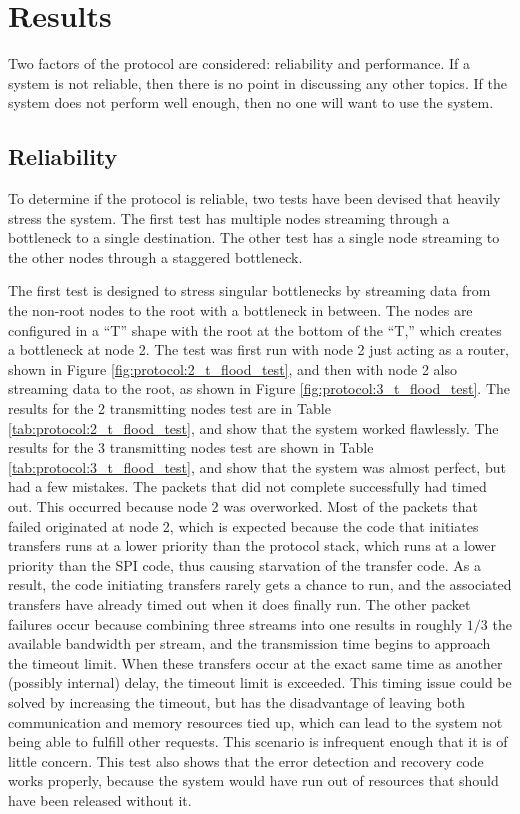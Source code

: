 \section{Results}\label{sec:protocol:results}

Two factors of the protocol are considered: reliability and performance. If a system is not reliable, then there is no point in discussing any other topics. If the system does not perform well enough, then no one will want to use the system.

\subsection{Reliability}\label{sec:protocol:results:reliability}

To determine if the protocol is reliable, two tests have been devised that heavily stress the system. The first test has multiple nodes streaming through a bottleneck to a single destination. The other test has a single node streaming to the other nodes through a staggered bottleneck. 

The first test is designed to stress singular bottlenecks by streaming data from the non-root nodes to the root with a bottleneck in between. The nodes are configured in a ``T'' shape with the root at the bottom of the ``T,'' which creates a bottleneck at node 2. The test was first run with node 2 just acting as a router, shown in Figure \ref{fig:protocol:2_t_flood_test}, and then with node 2 also streaming data to the root, as shown in Figure \ref{fig:protocol:3_t_flood_test}. The results for the 2 transmitting nodes test are in Table \ref{tab:protocol:2_t_flood_test}, and show that the system worked flawlessly. The results for the 3 transmitting nodes test are shown in Table \ref{tab:protocol:3_t_flood_test}, and show that the system was almost perfect, but had a few mistakes. The packets that did not complete successfully had timed out. This occurred because node 2 was overworked. Most of the packets that failed originated at node 2, which is expected because the code that initiates transfers runs at a lower priority than the protocol stack, which runs at a lower priority than the SPI code, thus causing starvation of the transfer code. As a result, the code initiating transfers rarely gets a chance to run, and the associated transfers have already timed out when it does finally run. The other packet failures occur because combining three streams into one results in roughly $1/3$ the available bandwidth per stream, and the transmission time begins to approach the timeout limit. When these transfers occur at the exact same time as another (possibly internal) delay, the timeout limit is exceeded. This timing issue could be solved by increasing the timeout, but has the disadvantage of leaving both communication and memory resources tied up, which can lead to the system not being able to fulfill other requests. This scenario is infrequent enough that it is of little concern. This test also shows that the error detection and recovery code works properly, because the system would have run out of resources that should have been released without it.

